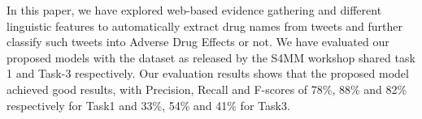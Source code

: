 In this paper, we have explored web-based evidence gathering and different linguistic features to automatically extract drug names from tweets and further classify such tweets into Adverse Drug Effects or not. We have evaluated our proposed models with the dataset as released by the S4MM workshop shared task 1 and Task-3 respectively. Our evaluation results shows that the proposed model achieved good results, with Precision, Recall and F-scores of 78\%, 88\% and 82\% respectively for Task1 and 33\%, 54\% and 41\% for Task3.
